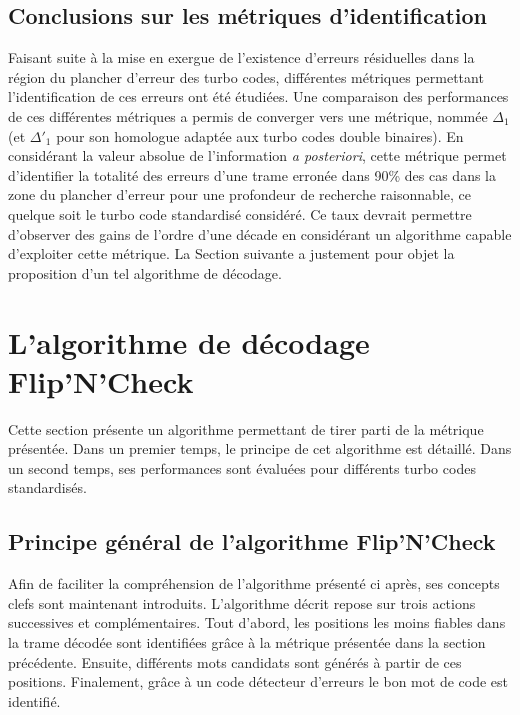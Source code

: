 \subsection{Conclusions sur les métriques d'identification}
Faisant suite à la mise en exergue de l'existence d'erreurs résiduelles dans la région du plancher d'erreur des turbo codes,
différentes métriques permettant l'identification de ces erreurs ont été étudiées. Une comparaison des performances de ces 
différentes métriques a permis de converger vers une métrique, nommée $\Delta_1$ (et $\Delta'_1$ pour son homologue 
adaptée aux turbo codes double binaires). En considérant la valeur absolue de l'information \textit{a posteriori}, cette
métrique permet d'identifier la totalité des erreurs d'une trame erronée dans 90\% des cas dans la zone du plancher 
d'erreur pour une profondeur de recherche raisonnable, ce quelque soit le turbo code standardisé considéré. Ce taux devrait
permettre d'observer des gains de l'ordre d'une décade en considérant un algorithme capable d'exploiter cette métrique. 
La Section suivante a justement pour 
objet la proposition d'un tel algorithme de décodage.

\section{L'algorithme de décodage Flip'N'Check}
Cette section présente un algorithme permettant de tirer parti de la métrique présentée.
Dans un premier temps, le principe de cet algorithme est détaillé. Dans un second temps, ses performances sont évaluées 
pour différents turbo codes standardisés.


\subsection{Principe général de l'algorithme Flip'N'Check}
Afin de faciliter la compréhension de l'algorithme présenté ci après, ses concepts clefs sont maintenant introduits.
L'algorithme décrit repose sur trois actions successives et complémentaires. Tout d'abord, les positions les moins fiables dans la trame 
décodée sont identifiées grâce à la métrique présentée dans la section précédente. Ensuite, différents mots candidats sont générés
à partir de ces positions. Finalement, grâce à un code détecteur d'erreurs le bon mot de code est identifié.

